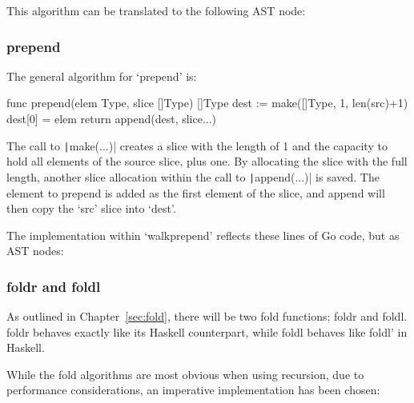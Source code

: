 This algorithm can be translated to the following AST node:

\begin{code}
\end{code}

\subsubsection{prepend}

The general algorithm for `prepend' is:
\begin{code}
    \begin{gocode}
func prepend(elem Type, slice []Type) []Type {
    dest := make([]Type, 1, len(src)+1)
    dest[0] = elem
    return append(dest, slice...)
}
    \end{gocode}
\end{code}

The call to \texttt|make(...)| creates a slice with the length of 1 and the capacity
to hold all elements of the source slice, plus one. By allocating the slice with the full
length, another slice allocation within the call to \texttt|append(...)| is saved.
The element to prepend is added as the first element of the slice, and append will then
copy the `src' slice into `dest'.

The implementation within `walkprepend' reflects these lines of Go code, but
as AST nodes:

\begin{code}
\end{code}

\subsubsection{foldr and foldl}

As outlined in Chapter~\ref{sec:fold}, there will be two fold functions;
foldr and foldl. foldr behaves exactly like its Haskell counterpart,
while foldl behaves like foldl' in Haskell.

While the fold algorithms are most obvious when using recursion, due to
performance considerations, an imperative implementation has been chosen:

